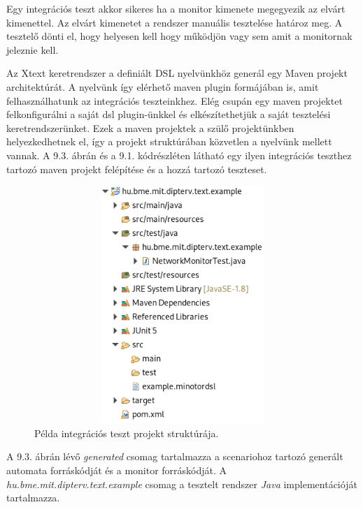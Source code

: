 Egy integrációs teszt akkor sikeres ha a monitor kimenete megegyezik az elvárt kimenettel.
Az elvárt kimenetet a rendszer manuális tesztelése határoz meg.
A tesztelő dönti el, hogy helyesen kell hogy működjön vagy sem amit a monitornak jeleznie kell.

\clearpage

Az Xtext keretrendszer a definiált DSL nyelvünkhöz generál egy Maven projekt architektúrát.
A nyelvünk így elérhető maven plugin formájában is, amit felhasználhatunk az integrációs teszteinkhez.
Elég csupán egy maven projektet felkonfigurálni a saját dsl plugin-ünkkel és elkészítethetjük a saját tesztelési keretrendszerünket.
Ezek a maven projektek a szülő projektünkben helyezkedhetnek el, így a projekt struktúrában közvetlen a nyelvünk mellett vannak.
A 9.3. ábrán és a 9.1. kódrészléten látható egy ilyen integrációs teszthez tartozó maven projekt felépítése és a hozzá tartozó teszteset.

\begin{figure}[!ht]
    \centering
    \includegraphics[width=150mm, height=9cm, keepaspectratio]{figures/integration_test_structure.png}
    \caption{Példa integrációs teszt projekt struktúrája.}
\end{figure}

A 9.3. ábrán lévő \textit{generated} csomag tartalmazza a scenariohoz tartozó generált automata forráskódját és a monitor forráskódját.
A \textit{hu.bme.mit.dipterv.text.example} csomag a tesztelt rendszer \textit{Java} implementációját tartalmazza.

